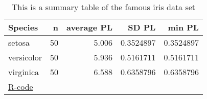 \begin{table}

\caption{\label{tab:}This is a summary table of the famous iris data set
        }
\centering
\begin{tabular}[t]{lrrrr}
\toprule
Species & n & average PL & SD PL & min PL\\
\midrule
setosa & 50 & 5.006 & 0.3524897 & 0.3524897\\
versicolor & 50 & 5.936 & 0.5161711 & 0.5161711\\
virginica & 50 & 6.588 & 0.6358796 & 0.6358796\\
\bottomrule
\multicolumn{5}{l}{\href{https://github.com/TobiasRoth/RtoAuthorea/blob/master/tables/latex_table/latex_table.R}{R-code}}\\
\end{tabular}
\end{table}

